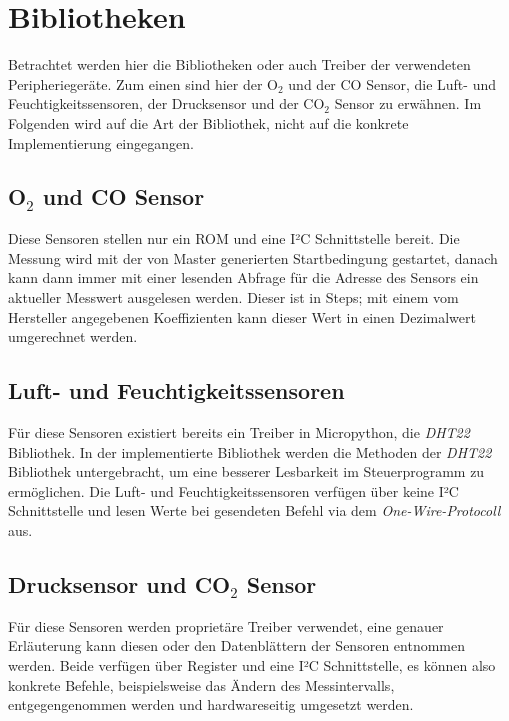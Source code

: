 \documentclass[a4paper, 12pt]{article}
\begin{document}
\section{Bibliotheken}
Betrachtet werden hier die Bibliotheken oder auch Treiber der verwendeten Peripheriegeräte. Zum einen sind hier der O$_2$ und der CO Sensor, die Luft- und Feuchtigkeitssensoren, der Drucksensor und der CO$_2$ Sensor zu erwähnen. Im Folgenden wird auf die Art der Bibliothek, nicht auf die konkrete Implementierung eingegangen.
\subsection{O$_2$ und CO Sensor}
Diese Sensoren stellen nur ein ROM und eine I²C Schnittstelle bereit. Die Messung wird mit der von Master generierten Startbedingung gestartet, danach kann dann immer mit einer lesenden Abfrage für die Adresse des Sensors ein aktueller Messwert ausgelesen werden. Dieser ist in Steps; mit einem vom Hersteller angegebenen Koeffizienten kann dieser Wert in einen Dezimalwert umgerechnet werden.
\subsection{Luft- und Feuchtigkeitssensoren}
Für diese Sensoren existiert bereits ein Treiber in Micropython, die \textit{DHT22} Bibliothek. In der implementierte Bibliothek werden die Methoden der \textit{DHT22} Bibliothek untergebracht, um eine besserer Lesbarkeit im Steuerprogramm zu ermöglichen. Die Luft- und Feuchtigkeitssensoren verfügen über keine I²C Schnittstelle und lesen Werte bei gesendeten Befehl via dem \textit{One-Wire-Protocoll} aus. 
\subsection{Drucksensor und CO$_2$ Sensor}
Für diese Sensoren werden proprietäre Treiber verwendet, eine genauer Erläuterung kann diesen oder den Datenblättern der Sensoren entnommen werden. Beide verfügen über Register und eine I²C Schnittstelle, es können also konkrete Befehle, beispielsweise das Ändern des Messintervalls, entgegengenommen werden und hardwareseitig umgesetzt werden.
\end{document}
